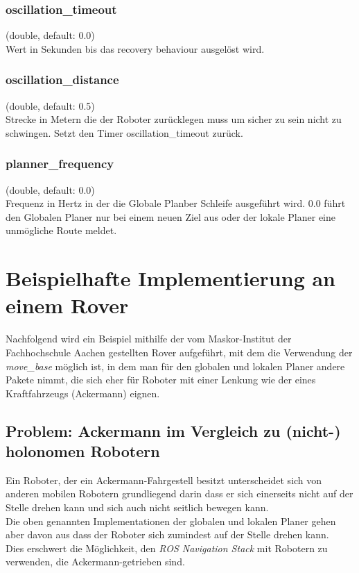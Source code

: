 \documentclass[oribibl]{llncs}
\begin{document}
\subsubsection{oscillation\_timeout} (double, default: 0.0)\\
	Wert in Sekunden bis das recovery behaviour ausgelöst wird.
\subsubsection{oscillation\_distance} (double, default: 0.5)\\
	Strecke in Metern die der Roboter zurücklegen muss um sicher zu sein nicht zu 	schwingen. Setzt den Timer oscillation\_timeout zurück.
\subsubsection{planner\_frequency} (double, default: 0.0)\\
	Frequenz in Hertz in der die Globale Planber Schleife ausgeführt wird.
	0.0 führt den Globalen Planer nur bei einem neuen Ziel aus oder der lokale Planer eine unmögliche Route meldet.	
\newpage
\section{Beispielhafte Implementierung an einem Rover}
Nachfolgend wird ein Beispiel mithilfe der vom Maskor-Institut der Fachhochschule Aachen gestellten Rover aufgeführt, mit dem die Verwendung der \textit{move\_base} möglich ist, in dem man für den globalen und lokalen Planer andere Pakete nimmt, die sich eher für Roboter mit einer Lenkung wie der eines Kraftfahrzeugs (Ackermann) eignen.\\
\subsection{Problem: Ackermann im Vergleich zu (nicht-) holonomen Robotern}
Ein Roboter, der ein Ackermann-Fahrgestell besitzt unterscheidet sich von anderen mobilen Robotern grundliegend darin dass er sich einerseits nicht auf der Stelle drehen kann und sich auch nicht seitlich bewegen kann.\\
Die oben genannten Implementationen der globalen und lokalen Planer gehen aber davon aus dass der Roboter sich zumindest auf der Stelle drehen kann.\\
Dies erschwert die Möglichkeit, den \textit{ROS Navigation Stack} mit Robotern zu verwenden, die Ackermann-getrieben sind.\cite{ackermannGroup}
\end{document}
